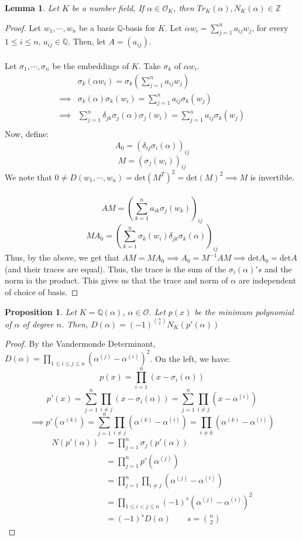 \documentclass{article}
\newcommand{\air}{\mathcal{O}_K}
\newcommand{\Q}{\mathbb{Q}}
\newcommand{\Z}{\mathbb{Z}}
\newtheorem{proposition}{Proposition}[subsection]
\newtheorem{lemma}{Lemma}[subsection]
\begin{document}
\begin{lemma}
Let $K$ be a number field, If $\alpha\in\air$, then $Tr_K(\alpha),N_K(\alpha)\in\Z$
\end{lemma}
\begin{proof}
Let $w_1,\cdots, w_n$ be a basis $\Q$-basis for $K$. Let $\alpha w_i=\displaystyle\sum_{j=1}^na_{ij}w_j$, for every $1\leq i\leq n$, $a_{ij}\in\Q$. Then, let $A=(a_{ij})$.
\\
\\
Let $\sigma_1,\cdots, \sigma_n$ be the embeddings of $K$. Take $\sigma_k$ of $\alpha w_i$.
\begin{align*}
    &\sigma_k(\alpha w_i) = \sigma_k\left(\sum_{j=1}^n a_{ij} w_j\right)\\
    \implies &\sigma_k(\alpha)\sigma_k(w_i) =\sum_{j=1}^n a_{ij}\sigma_k(w_j)\\
    \implies &\sum_{j=1}^n \delta_{jk}\sigma_j(\alpha)\sigma_j(w_i)=\sum_{j=1}^n a_{ij}\sigma_k(w_j)\\
\end{align*}
Now, define:
$$A_0 = (\delta_{ij}\sigma_i(\alpha))_{ij}$$
$$M= (\sigma_j(w_i))_{ij}$$
We note that $0\neq D(w_1,\cdots, w_n) = \text{det}(M^T)^2 = \text{det}(M)^2 \implies M$ is invertible.\\
\\
$$AM=\left(\sum_{k=1}^n a_{ik}\sigma_j(w_k)\right)_{ij}$$
$$MA_0 = \left(\sum_{k=1}^n\sigma_k(w_i)\delta_{jk}\sigma_k(\alpha)\right)_{ij}$$
Thus, by the above, we get that $AM=MA_0\implies A_0 = M^{-1}AM\implies \text{det}A_0=\text{det} A$ (and their traces are equal). Thus, the trace is the sum of the $\sigma_i(\alpha)'s$ and the norm ia the product. This gives us that the trace and norm of $\alpha$ are independent of choice of basis.
\end{proof}
\newpage
\begin{proposition}
Let $K=\Q(\alpha)$, $\alpha\in\mathcal{O}$. Let $p(x)$ be the minimum polynomial of $\alpha$ of degree $n$. Then, $D(\alpha)=(-1)^{{{n}\choose{2}}} N_K(p'(\alpha))$
\end{proposition}
\begin{proof}
By the Vandermonde Determinant, $D(\alpha)=\displaystyle\prod_{1\leq i\leq j\leq n}(\alpha^{(j)}-\alpha^{(i)})^2$. On the left, we have:
$$p(x)=\prod_{i=1}^n (x-\sigma_i(\alpha))$$
$$p'(x)=\sum_{j=1}^n \prod_{i\neq j} (x-\sigma_i(\alpha)) =\sum_{j=1}^n \prod_{i\neq j} (x-\alpha^{(i)})$$
$$\implies p'(\alpha^{(k)}) = \sum_{j=1}^n \prod_{i\neq j} (\alpha^{(k)}-\alpha^{(i)})=\prod_{i\neq k}(\alpha^{(k)}-\alpha^{(i)})$$
\begin{align*}
    N(p'(\alpha))&=\prod_{j=1}^n \sigma_j(p'(\alpha))\\
    &=\prod_{j=1}^n p'(\alpha^{(j)})\\
    &=\prod_{j=1}^n\prod_{i\neq j} (\alpha^{(j)}-\alpha^{(i)})\\
    &=\prod_{1\leq i < j\leq n} (-1)^s(\alpha^{(j)}-\alpha^{(i)})^2\\
    &=(-1)^sD(\alpha)\qquad s={{n}\choose {2}}
\end{align*}
\end{proof}
\end{document}
